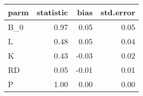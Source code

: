 \begin{tabular}{lrrr}
  \hline
parm & statistic & bias & std.error \\ 
  \hline
B\_0 & 0.97 & 0.05 & 0.05 \\ 
  L & 0.48 & 0.05 & 0.04 \\ 
  K & 0.43 & -0.03 & 0.02 \\ 
  RD & 0.05 & -0.01 & 0.01 \\ 
  P & 1.00 & 0.00 & 0.00 \\ 
   \hline
\end{tabular}
